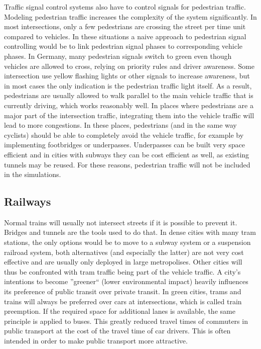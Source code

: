 Traffic signal control systems also have to control signals for pedestrian traffic. Modeling pedestrian traffic increases the complexity of the system significantly. In most intersections, only a few pedestrians are crossing the street per time unit compared to vehicles. In these situations a naive approach to pedestrian signal controlling would be to link pedestrian signal phases to corresponding vehicle phases. In Germany, many pedestrian signals switch to green even though vehicles are allowed to cross, relying on priority rules and driver awareness. Some intersection use yellow flashing lights or other signals to increase awareness, but in most cases the only indication is the pedestrian traffic light itself. As a result, pedestrians are usually allowed to walk parallel to the main vehicle traffic that is currently driving, which works reasonably well. In places where pedestrians are a major part of the intersection traffic, integrating them into the vehicle traffic will lead to more congestions. In these places, pedestrians (and in the same way cyclists) should be able to completely avoid the vehicle traffic, for example by implementing footbridges or underpasses. Underpasses can be built very space efficient and in cities with subways they can be cost efficient as well, as existing tunnels may be reused. For these reasons, pedestrian traffic will not be included in the simulations. \cite{pedest_traffic}

\subsection*{Railways}

Normal trains will usually not intersect streets if it is possible to prevent it. Bridges and tunnels are the tools used to do that. In dense cities with many tram stations, the only options would be to move to a subway system or a suspension railroad system, both alternatives (and especially the latter) are not very cost effective and are usually only deployed in large metropolises. Other cities will thus be confronted with tram traffic being part of the vehicle traffic. A city's intentions to become ''greener`` (lower environmental impact) heavily influences its preference of public transit over private transit. In green cities, trams and trains will always be preferred over cars at intersections, which is called train preemption. If the required space for additional lanes is available, the same principle is applied to buses. This greatly reduced travel times of commuters in public transport at the cost of the travel time of car drivers. This is often intended in order to make public transport more attractive.

